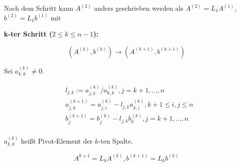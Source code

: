 \documentclass[a4paper,10pt]{article}
\newtheorem[L]{satz}{Satz}[section]
\newtheorem[S]{beweis}{Beweis}
\newtheorem[S]{beh}{Behauptung}
\begin{document}
Nach dem Schritt kann $A^{(2)}$ anders geschrieben werden als $A^{(2)} = L_1 A^{(1)}$, $b^{(2)}=L_1 b^{(1)}$ mit

\begin{comment}
\[
  L_1 = \begin{pmatrix}
    1 & & & & 0 \\
    -l_{2,1} & 1 \\
    -l_{3,1} & 0 & 1 \\
     \vdots & \vdots & & \ddots \\
     -l_{n,1} & 0 & 0 & \dots & 1 \\
  \end{pmatrix}
\]
\end{comment}

\textbf{k-ter Schritt ($2 \leq k \leq n-1$):}

\[
  (A^{(k)}, b^{(k)}) \rightarrow (A^{(k+1)}, b^{(k+1)})
\]

\begin{comment}
\[
  \begin{pmatrix}
    a_{1, 1}^(1) & & & & \dots & a_{1, n}^(1) & b_1^{(1)} \\
    0 & a_%
    0 & 0 & \ddots & & &  & \vdots & \vdots \\
    0 & 0 & 0 & a_{k, k}^(k) & \dots & a_{k, n}^(k) & b_k^{(k)} \\
    \vdots & \vdots & \vdots & \vdots & & \vdots & \vdots \\
    0 & 0 & 0 & a_{n, k}^(k) & \dots & a_{n, n}^(k) & b_n^{(k)} \\
  \end{pmatrix}
\]
\end{comment}

Sei $a_{k,k}^{(k)} \neq 0$.

\begin{align*}
  &l_{j, k} := a_{j,k}^{(k)} / a_{k,k}^{(k)}, j=k+1,\dots, n \\
  &a_{j,k}^{(k+1)} = a_{j,i}^{(k)} - l_{j, k} a_{k,i}^{(k)}, k+1 \leq i,j \leq n \\
  &b_{j}^{(k+1)} = b_{j}^{(k)} - l_{j, k} b_{k}^{(k)}, j=k+1,\dots, n \\
\end{align*}

$a_{k,k}^{(k)}$ heißt Pivot-Element der $k$-ten Spalte.

\[
  A^{k+1} = L_k A^{(k)}, b^{(k+1)} = L_k b^{(k)}
\]
\end{document}
